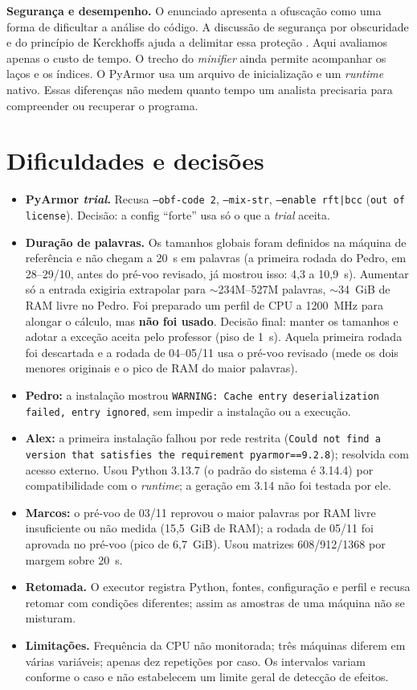 \documentclass[12pt]{article}
\begin{document}
\textbf{Segurança e desempenho.} O enunciado apresenta a ofuscação como uma forma de dificultar a análise
do código. A discussão de segurança por obscuridade e do princípio de Kerckhoffs ajuda a delimitar essa
proteção \cite{kerckhoffs1883,tanenbaum2016}. Aqui avaliamos apenas o custo de tempo. O trecho do
\emph{minifier} ainda permite acompanhar os laços e os índices. O PyArmor usa um arquivo de inicialização
e um \emph{runtime} nativo. Essas diferenças não medem quanto tempo um analista precisaria para compreender
ou recuperar o programa.

\section{Dificuldades e decisões}
\begin{itemize}
\item \textbf{PyArmor \emph{trial}.} Recusa \texttt{--obf-code 2}, \texttt{--mix-str}, \texttt{--enable rft|bcc}
(\texttt{out of license}). Decisão: a config ``forte'' usa só o que a \emph{trial} aceita.
\item \textbf{Duração de palavras.} Os tamanhos globais foram definidos na máquina de referência e não chegam
a 20~s em palavras (a primeira rodada do Pedro, em 28--29/10, antes do pré-voo revisado, já mostrou isso: 4,3 a 10,9~s).
Aumentar só a entrada exigiria extrapolar para ${\sim}$234M--527M palavras, ${\sim}$34~GiB de RAM livre no Pedro. Foi
preparado um perfil de CPU a 1200~MHz para alongar o cálculo, mas \textbf{não foi usado}. Decisão final: manter
os tamanhos e adotar a exceção aceita pelo professor (piso de 1~s). Aquela primeira rodada foi descartada e a
rodada de 04--05/11 usa o pré-voo revisado (mede os dois menores originais e o pico de RAM do maior palavras).
\item \textbf{Pedro:} a instalação mostrou \texttt{WARNING: Cache entry deserialization failed, entry ignored}, sem impedir a instalação ou a execução.
\item \textbf{Alex:} a primeira instalação falhou por rede restrita (\texttt{Could not find a version that satisfies
the requirement pyarmor==9.2.8}); resolvida com acesso externo. Usou Python 3.13.7 (o padrão do sistema é 3.14.4)
por compatibilidade com o \emph{runtime}; a geração em 3.14 não foi testada por ele.
\item \textbf{Marcos:} o pré-voo de 03/11 reprovou o maior palavras por RAM livre insuficiente ou não medida (15,5~GiB de RAM);
a rodada de 05/11 foi aprovada no pré-voo (pico de 6,7~GiB). Usou matrizes 608/912/1368 por margem sobre 20~s.
\item \textbf{Retomada.} O executor registra Python, fontes, configuração e perfil e recusa retomar com
condições diferentes; assim as amostras de uma máquina não se misturam.
\item \textbf{Limitações.} Frequência da CPU não monitorada; três máquinas diferem em várias variáveis; apenas dez
repetições por caso. Os intervalos variam conforme o caso e não estabelecem um limite geral de detecção de efeitos.
\end{itemize}
\end{document}
